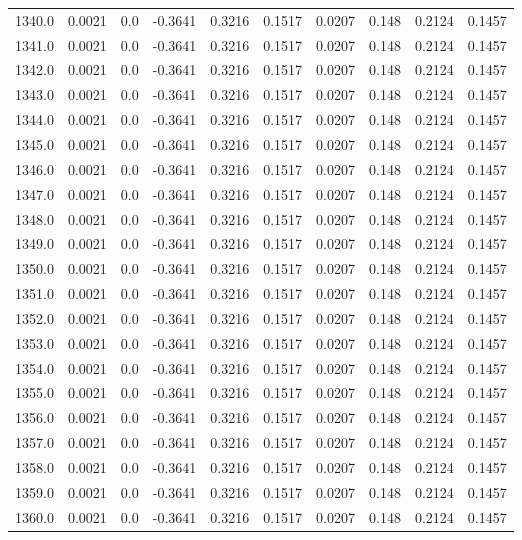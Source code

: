\begin{longtable}{lrrrrrrrrr}
1340.0 & 0.0021 & 0.0 & -0.3641 & 0.3216 & 0.1517 & 0.0207 & 0.148 & 0.2124 & 0.1457 \\
1341.0 & 0.0021 & 0.0 & -0.3641 & 0.3216 & 0.1517 & 0.0207 & 0.148 & 0.2124 & 0.1457 \\
1342.0 & 0.0021 & 0.0 & -0.3641 & 0.3216 & 0.1517 & 0.0207 & 0.148 & 0.2124 & 0.1457 \\
1343.0 & 0.0021 & 0.0 & -0.3641 & 0.3216 & 0.1517 & 0.0207 & 0.148 & 0.2124 & 0.1457 \\
1344.0 & 0.0021 & 0.0 & -0.3641 & 0.3216 & 0.1517 & 0.0207 & 0.148 & 0.2124 & 0.1457 \\
1345.0 & 0.0021 & 0.0 & -0.3641 & 0.3216 & 0.1517 & 0.0207 & 0.148 & 0.2124 & 0.1457 \\
1346.0 & 0.0021 & 0.0 & -0.3641 & 0.3216 & 0.1517 & 0.0207 & 0.148 & 0.2124 & 0.1457 \\
1347.0 & 0.0021 & 0.0 & -0.3641 & 0.3216 & 0.1517 & 0.0207 & 0.148 & 0.2124 & 0.1457 \\
1348.0 & 0.0021 & 0.0 & -0.3641 & 0.3216 & 0.1517 & 0.0207 & 0.148 & 0.2124 & 0.1457 \\
1349.0 & 0.0021 & 0.0 & -0.3641 & 0.3216 & 0.1517 & 0.0207 & 0.148 & 0.2124 & 0.1457 \\
1350.0 & 0.0021 & 0.0 & -0.3641 & 0.3216 & 0.1517 & 0.0207 & 0.148 & 0.2124 & 0.1457 \\
1351.0 & 0.0021 & 0.0 & -0.3641 & 0.3216 & 0.1517 & 0.0207 & 0.148 & 0.2124 & 0.1457 \\
1352.0 & 0.0021 & 0.0 & -0.3641 & 0.3216 & 0.1517 & 0.0207 & 0.148 & 0.2124 & 0.1457 \\
1353.0 & 0.0021 & 0.0 & -0.3641 & 0.3216 & 0.1517 & 0.0207 & 0.148 & 0.2124 & 0.1457 \\
1354.0 & 0.0021 & 0.0 & -0.3641 & 0.3216 & 0.1517 & 0.0207 & 0.148 & 0.2124 & 0.1457 \\
1355.0 & 0.0021 & 0.0 & -0.3641 & 0.3216 & 0.1517 & 0.0207 & 0.148 & 0.2124 & 0.1457 \\
1356.0 & 0.0021 & 0.0 & -0.3641 & 0.3216 & 0.1517 & 0.0207 & 0.148 & 0.2124 & 0.1457 \\
1357.0 & 0.0021 & 0.0 & -0.3641 & 0.3216 & 0.1517 & 0.0207 & 0.148 & 0.2124 & 0.1457 \\
1358.0 & 0.0021 & 0.0 & -0.3641 & 0.3216 & 0.1517 & 0.0207 & 0.148 & 0.2124 & 0.1457 \\
1359.0 & 0.0021 & 0.0 & -0.3641 & 0.3216 & 0.1517 & 0.0207 & 0.148 & 0.2124 & 0.1457 \\
1360.0 & 0.0021 & 0.0 & -0.3641 & 0.3216 & 0.1517 & 0.0207 & 0.148 & 0.2124 & 0.1457 \\

\end{longtable}
